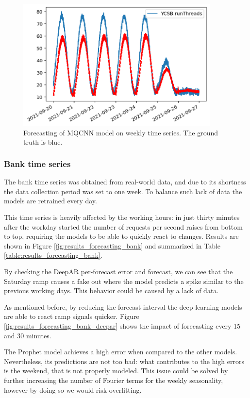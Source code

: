 \documentclass[a4paper, 12pt]{article} %
\begin{document}
	\begin{figure} \centering
		\includegraphics[width=4in]{img/results_forecasting_weekly_mqcnn.png}
		\caption{Forecasting of MQCNN model on weekly time series. The ground truth is blue.}
		\label{fig:results_forecasting_weekly_mqcnn}
	\end{figure}
	
	\clearpage
	\subsubsection{Bank time series} \label{sssec:results_forecasting_bank}
	The bank time series was obtained from real-world data, and due to its shortness the data collection period was set to one week. To balance such lack of data the models are retrained every day. 
	
	This time series is heavily affected by the working hours: in just thirty minutes after the workday started the number of requests per second raises from bottom to top, requiring the models to be able to quickly react to changes. Results are shown in Figure \ref{fig:results_forecasting_bank} and summarized in Table \ref{table:results_forecasting_bank}. 
	
	By checking the DeepAR per-forecast error and forecast, we can see that the Saturday ramp causes a fake out where the model predicts a spike similar to the previous working days. This behavior could be caused by a lack of data.
	
	As mentioned before, by reducing the forecast interval the deep learning models are able to react ramp signals quicker. Figure \ref{fig:results_forecasting_bank_deepar} shows the impact of forecasting every 15 and 30 minutes.
	
	The Prophet model achieves a high error when compared to the other models. Nevertheless, its predictions are not too bad: what contributes to the high errors is the weekend, that is not properly modeled. This issue could be solved by further increasing the number of Fourier terms for the weekly seasonality, however by doing so we would risk overfitting.
	
\end{document}
